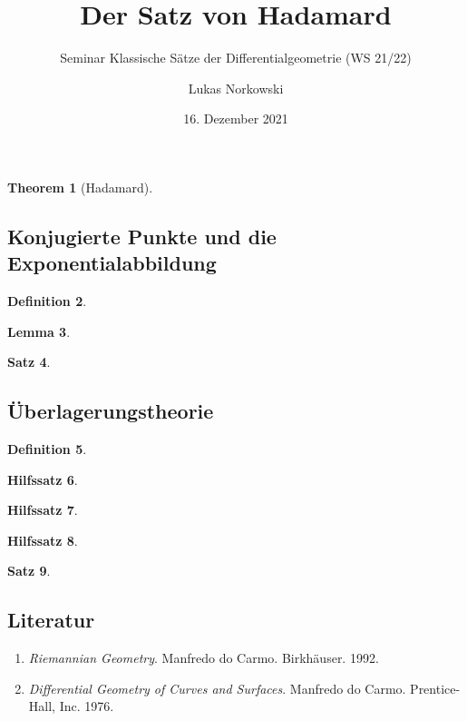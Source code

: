 \documentclass[a4paper, ngerman]{scrartcl}
\title{Der Satz von Hadamard}
\subtitle{Seminar Klassische Sätze der Differentialgeometrie (WS 21/22)}
\author{Lukas Norkowski}
\date{16. Dezember 2021}
\theoremstyle{mytheorem}
\newtheorem{theorem}{Theorem}
\newtheorem{satz}[theorem]{Satz}
\newtheorem{hsatz}[theorem]{Hilfssatz}
\newtheorem{lemma}[theorem]{Lemma}
\theoremstyle{definition}
\newtheorem{definition}[theorem]{Definition}
\begin{document}
	\maketitle
	\thispagestyle{empty}	

\begin{theorem}[Hadamard]
	
\end{theorem}

\subsection*{Konjugierte Punkte und die Exponentialabbildung}

\begin{definition}
	
\end{definition}

\begin{lemma}
	
\end{lemma}

\begin{satz}
	
\end{satz}

\subsection*{Überlagerungstheorie}

\begin{definition}
	
\end{definition}

\begin{hsatz}
	
\end{hsatz}

\begin{hsatz}
	
\end{hsatz}

\begin{hsatz}
	
\end{hsatz}

\begin{satz}
	
\end{satz}

\subsection*{Literatur}
\begin{enumerate}
	\item \emph{Riemannian Geometry}. Manfredo do Carmo. Birkhäuser. 1992.
	\item \emph{Differential Geometry of Curves and Surfaces}. Manfredo do Carmo. Prentice-Hall, Inc. 1976.
\end{enumerate}
\end{document}
